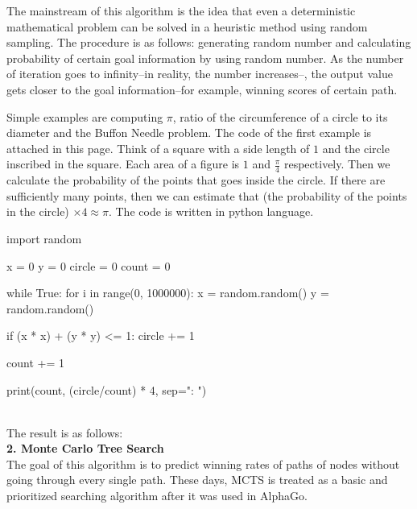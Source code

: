\documentclass[11pt]{article}
\begin{document}
	The mainstream of this algorithm is the idea that even a deterministic mathematical problem can be solved in a heuristic method using random sampling. The procedure is as follows: generating random number and calculating probability of certain goal information by using random number. As the number of iteration goes to infinity--in reality, the number increases--, the output value gets closer to the goal information--for example, winning scores of certain path.
	
	Simple examples are computing $\pi$, ratio of the circumference of a circle to its diameter and the Buffon Needle problem. The code of the first example is attached in this page. Think of a square with a side length of $1$ and the circle inscribed in the square. Each area of a figure is $1$ and $\frac{\pi}{4}$ respectively. Then we calculate the probability of the points that goes inside the circle. If there are sufficiently many points, then we can estimate that (the probability of the points in the circle) $\times 4 \approx \pi$. The code is written in python language.
	\begin{spverbatim}
	import random
    
x = 0
y = 0
circle = 0
count = 0

while True:
    for i in range(0, 1000000):
        x = random.random()
        y = random.random()
           
        if (x * x) + (y * y) <= 1:
            circle += 1
            
        count += 1

    print(count, (circle/count) * 4, sep=": ")

	\end{spverbatim}\\
	
	The result is as follows: \\
	\textbf{2. Monte Carlo Tree Search}\\
The goal of this algorithm is to predict winning rates of paths of nodes without going through every single path. These days, MCTS is treated as a basic and prioritized searching algorithm after it was used in AlphaGo.\\
\end{document}

